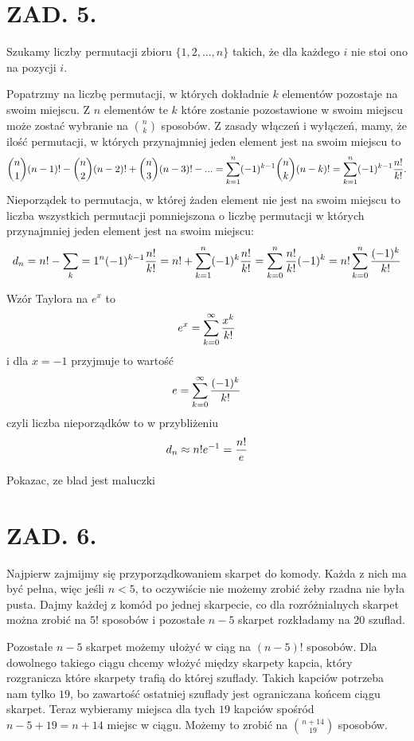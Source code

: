 \documentclass{article}[13pt]
\begin{document}
\section*{ZAD. 5.}

Szukamy liczby permutacji zbioru $\{1,2,...,n\}$ takich, że dla każdego $i$ nie stoi ono na pozycji $i$.
\medskip

Popatrzmy na liczbę permutacji, w których dokładnie $k$ elementów pozostaje na swoim miejscu. Z $n$ elementów te $k$ które zostanie pozostawione w swoim miejscu może zostać wybranie na ${n\choose k}$ sposobów. Z zasady włączeń i wyłączeń, mamy, że ilość permutacji, w których przynajmniej jeden element jest na swoim miejscu to
\begin{align*}
    {n\choose 1}(n-1)!-{n\choose 2}(n-2)!+{n\choose 3}(n-3)!-...=\sum\limits_{k=1}^n(-1)^{k-1}{n\choose k}(n-k)!=\sum\limits_{k=1}^n(-1)^{k-1}{n!\over k!}.
\end{align*}
Nieporządek to permutacja, w której żaden element nie jest na swoim miejscu to liczba wszystkich permutacji pomniejszona o liczbę permutacji w których przynajmniej jeden element jest na swoim miejscu:
\begin{align*}
    d_n=n!-\sum\limits_k=1^n(-1)^{k-1}{n!\over k!}=n!+\sum\limits_{k=1}^n(-1)^k{n!\over k!}=\sum\limits_{k=0}^n{n!\over k!}(-1)^k=n!\sum\limits_{k=0}^n{(-1)^k\over k!}
\end{align*}

Wzór Taylora na $e^x$ to
$$e^x=\sum\limits_{k=0}^\infty{x^k\over k!}$$
i dla $x=-1$ przyjmuje to wartość
$$e=\sum\limits_{k=0}^\infty{(-1)^k\over k!}$$
czyli liczba nieporządków to w przybliżeniu
$$d_n\approx n!e^{-1}={n!\over e}$$

{\color{acc}Pokazac, ze blad jest maluczki}

\section*{ZAD. 6.}

Najpierw zajmijmy się przyporządkowaniem skarpet do komody. Każda z nich ma być pełna, więc jeśli $n<5$, to oczywiście nie możemy zrobić żeby rzadna nie była pusta. Dajmy każdej z komód po jednej skarpecie, co dla rozróżnialnych skarpet można zrobić na $5!$ sposobów i pozostałe $n-5$ skarpet rozkładamy na $20$ szuflad.
\medskip

Pozostałe $n-5$ skarpet możemy ułożyć w ciąg na $(n-5)!$ sposobów. Dla dowolnego takiego ciągu chcemy włożyć między skarpety kapcia, który rozgranicza które skarpety trafią do której szuflady. Takich kapciów potrzeba nam tylko $19$, bo zawartość ostatniej szuflady jest ograniczana końcem ciągu skarpet. Teraz wybieramy miejsca dla tych $19$ kapciów spośród $n-5+19=n+14$ miejsc w ciągu. Możemy to zrobić na ${n+14\choose 19}$ sposobów.
\medskip
\end{document}
